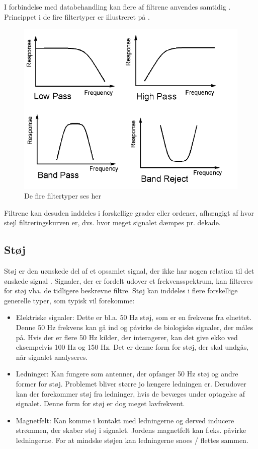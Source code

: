 I forbindelse med databehandling kan flere af filtrene anvendes samtidig \cite{Devasahayam2000}. Princippet i de fire filtertyper er illustreret på .
\begin{figure}[H]
\centering
\includegraphics[scale=0.8]{figures/bproblemanalyse/filtertyper.png}
\caption{De fire filtertyper ses her \cite{2. semester kristian}}
\label{filtertyper}
\end{figure}
Filtrene kan desuden inddeles i forskellige grader eller ordener, afhængigt af hvor stejl filtreringskurven er, dvs. hvor meget signalet dæmpes pr. dekade\cite{2. semester kristian}.

\subsection{Støj}\label{StoejAfsnit}
Støj er den uønskede del af et opsamlet signal, der ikke har nogen relation til det ønskede signal . Signaler, der er fordelt udover et frekvensspektrum, kan filtreres for støj vha. de tidligere beskrevne filtre. \cite{Devasahayam2000}
Støj kan inddeles i flere forskellige generelle typer, som typisk vil forekomme:

\begin{itemize}
\item Elektriske signaler: Dette er bl.a. 50 Hz støj, som er en frekvens fra elnettet. Denne 50 Hz frekvens kan gå ind og påvirke de biologiske signaler, der måles på. Hvis der er flere 50 Hz kilder, der interagerer, kan det give ekko ved eksempelvis 100 Hz og 150 Hz. Det er denne form for støj, der skal undgås, når signalet analyseres.
\item Ledninger: Kan fungere som antenner, der opfanger 50 Hz støj og andre former for støj. Problemet bliver større jo længere ledningen er. Derudover kan der forekommer støj fra ledninger, hvis de bevæges under optagelse af signalet. Denne form for støj er dog meget lavfrekvent. \cite{Webster2009}
\item Magnetfelt: Kan komme i kontakt med ledningerne og derved inducere strømmen, der skaber støj i signalet. Jordens magnetfelt kan f.eks. påvirke ledningerne. For at mindske støjen kan ledningerne snoes / flettes sammen.
\end{itemize} 